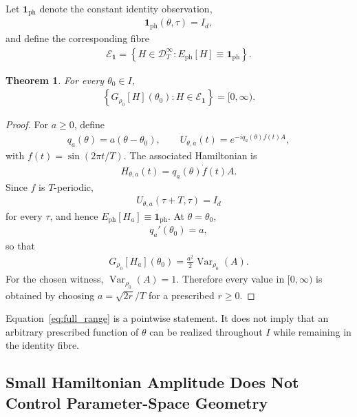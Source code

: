 \documentclass[twocolumn,prl,aps,floatfix]{revtex4-2}
\newtheorem{theorem}{Theorem}
\begin{document}
Let $\mathbf 1_{\mathrm{ph}}$ denote the constant identity observation,
\begin{align}
\mathbf 1_{\mathrm{ph}}(\theta,\tau)=I_d,
\end{align}
and define the corresponding fibre
\begin{align}
\mathcal E_{\mathbf 1}
=
\left\{
H\in\mathcal D_T^\infty:
E_{\mathrm{ph}}[H]\equiv\mathbf 1_{\mathrm{ph}}
\right\}.
\end{align}

\begin{theorem}
For every $\theta_0\in I$,
\begin{align}
\left\{
G_{\rho_0}[H](\theta_0):
H\in\mathcal E_{\mathbf 1}
\right\}
=
[0,\infty).
\label{eq:full_range}
\end{align}
\end{theorem}

\begin{proof}
For $a\ge0$, define
\begin{align}
q_a(\theta)=a(\theta-\theta_0),
\qquad
U_{\theta,a}(t)
=
e^{-iq_a(\theta)f(t)A},
\end{align}
with $f(t)=\sin(2\pi t/T)$. The associated Hamiltonian is
\begin{align}
H_{\theta,a}(t)
=
q_a(\theta)\dot f(t)A.
\end{align}
Since $f$ is $T$-periodic,
\begin{align}
U_{\theta,a}(\tau+T,\tau)
=
I_d
\end{align}
for every $\tau$, and hence
$E_{\mathrm{ph}}[H_a]\equiv\mathbf 1_{\mathrm{ph}}$. At $\theta=\theta_0$,
\begin{align}
q_a'(\theta_0)=a,
\end{align}
so that
\begin{align}
G_{\rho_0}[H_a](\theta_0)
=
\frac{a^2}{2}
\operatorname{Var}_{\rho_0}(A).
\end{align}
For the chosen witness,
$\operatorname{Var}_{\rho_0}(A)=1$. Therefore every value in
$[0,\infty)$ is obtained by choosing
$a=\sqrt{2r}/T$ for a prescribed $r\ge0$.
\end{proof}

Equation~\eqref{eq:full_range} is a pointwise statement. It does not imply that an arbitrary prescribed function of $\theta$ can be realized throughout $I$ while remaining in the identity fibre.

\subsection{Small Hamiltonian Amplitude Does Not Control Parameter-Space Geometry}
\end{document}
